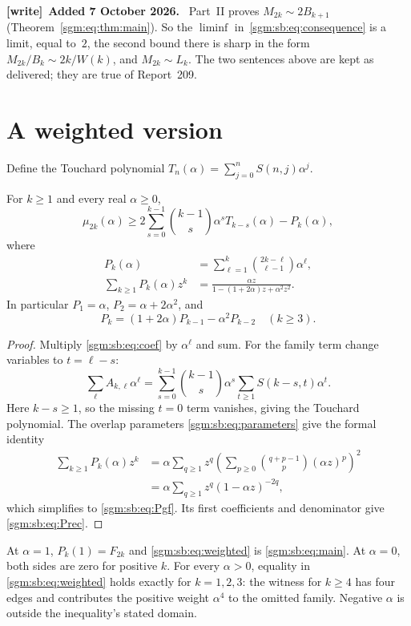 \documentclass[11pt,letterpaper]{article}
\theoremstyle{remark}\newtheorem{remark}[theorem]{Remark}
\newenvironment{writenote}[1][]{\par\smallskip\begingroup\small
 \noindent\textbf{[write]}\if\relax\detokenize{#1}\relax\else~\textbf{#1.}\fi\ }%
 {\par\endgroup\smallskip}
\theoremstyle{definition}\newtheorem{definition}[theorem]{Definition}
\begin{document}
\begin{writenote}[Added 7 October 2026]
Part~II proves $M_{2k}\sim2B_{k+1}$ (Theorem~\ref{sgm:eq:thm:main}). So the $\liminf$ in~\eqref{sgm:sb:eq:consequence} is a limit, equal to~$2$, the second bound there is sharp in the form $M_{2k}/B_k\sim2k/W(k)$, and $M_{2k}\sim L_k$. The two sentences above are kept as delivered; they are true of Report~209.
\end{writenote}

\section{A weighted version}
Define the Touchard polynomial $T_n(\alpha)=\sum_{j=0}^n S(n,j)\alpha^j$.
\begin{corollary}\label{sgm:sb:cor:weighted}
For $k\ge1$ and every real $\alpha\ge0$,
\begin{equation}\label{sgm:sb:eq:weighted}
 \mu_{2k}(\alpha)\ge
 2\sum_{s=0}^{k-1}\binom{k-1}{s}\alpha^s T_{k-s}(\alpha)-P_k(\alpha),
\end{equation}
where
\begin{align}
 P_k(\alpha)&=\sum_{\ell=1}^k\binom{2k-\ell}{\ell-1}\alpha^\ell,\label{sgm:sb:eq:Pk}\\
 \sum_{k\ge1}P_k(\alpha)z^k
 &=\frac{\alpha z}{1-(1+2\alpha)z+\alpha^2z^2}.\label{sgm:sb:eq:Pgf}
\end{align}
In particular $P_1=\alpha$, $P_2=\alpha+2\alpha^2$, and
\begin{equation}\label{sgm:sb:eq:Prec}
 P_k=(1+2\alpha)P_{k-1}-\alpha^2P_{k-2}\quad(k\ge3).
\end{equation}
\end{corollary}
\begin{proof}
Multiply \eqref{sgm:sb:eq:coef} by $\alpha^\ell$ and sum. For the family term change variables to $t=\ell-s$:
\[
 \sum_\ell A_{k,\ell}\alpha^\ell
 =\sum_{s=0}^{k-1}\binom{k-1}{s}\alpha^s
   \sum_{t\ge1}S(k-s,t)\alpha^t.
\]
Here $k-s\ge1$, so the missing $t=0$ term vanishes, giving the Touchard polynomial. The overlap parameters \eqref{sgm:sb:eq:parameters} give the formal identity
\begin{align*}
 \sum_{k\ge1}P_k(\alpha)z^k
 &=\alpha\sum_{q\ge1}z^q
   \left(\sum_{p\ge0}\binom{q+p-1}{p}(\alpha z)^p\right)^2\\
 &=\alpha\sum_{q\ge1}z^q(1-\alpha z)^{-2q},
\end{align*}
which simplifies to \eqref{sgm:sb:eq:Pgf}. Its first coefficients and denominator give \eqref{sgm:sb:eq:Prec}.
\end{proof}
At $\alpha=1$, $P_k(1)=F_{2k}$ and \eqref{sgm:sb:eq:weighted} is \eqref{sgm:sb:eq:main}. At $\alpha=0$, both sides are zero for positive $k$. For every $\alpha>0$, equality in \eqref{sgm:sb:eq:weighted} holds exactly for $k=1,2,3$: the witness for $k\ge4$ has four edges and contributes the positive weight $\alpha^4$ to the omitted family. Negative $\alpha$ is outside the inequality's stated domain.
\end{document}
